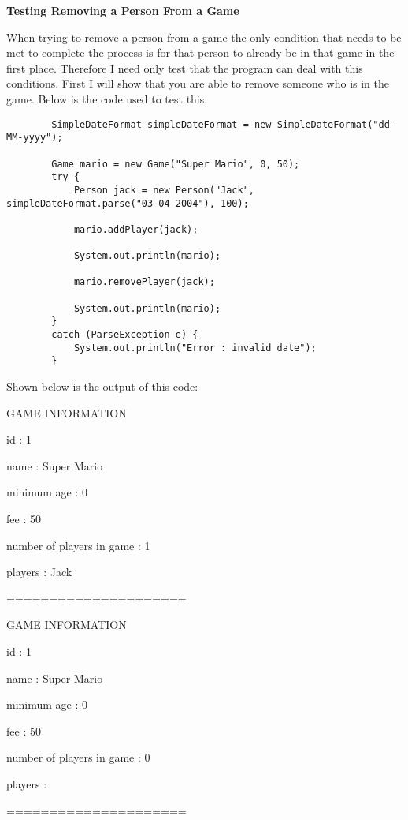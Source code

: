 \documentclass[a4paper]{article}
\begin{document}
\noindent \textbf{Testing Removing a Person From a Game}

When trying to remove a person from a game the only condition that needs to be met to complete the process is for that person to already be in that game in the first place. Therefore I need only test that the program can deal with this conditions. First I will show that you are able to remove someone who is in the game. Below is the code used to test this: \begin{lstlisting}
		SimpleDateFormat simpleDateFormat = new SimpleDateFormat("dd-MM-yyyy");

        Game mario = new Game("Super Mario", 0, 50);
        try {
            Person jack = new Person("Jack", simpleDateFormat.parse("03-04-2004"), 100);

            mario.addPlayer(jack);

            System.out.println(mario);

            mario.removePlayer(jack);

            System.out.println(mario);
        }
        catch (ParseException e) {
            System.out.println("Error : invalid date");
        }
\end{lstlisting}
Shown below is the output of this code: \newline

\noindent GAME INFORMATION

\noindent id : 1

\noindent name : Super Mario

\noindent minimum age : 0

\noindent fee : 50

\noindent number of players in game : 1

\noindent players : Jack 

\noindent =====================

\noindent GAME INFORMATION

\noindent id : 1

\noindent name : Super Mario

\noindent minimum age : 0

\noindent fee : 50

\noindent number of players in game : 0

\noindent players : 

\noindent ===================== \newline
\end{document}
